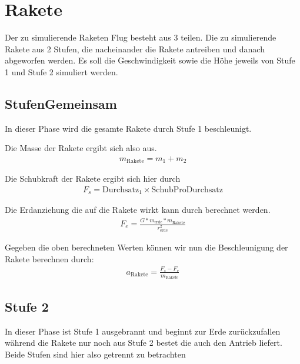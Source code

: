 \documentclass[10pt]{scrartcl}
\author{Oliver Steenbuck, Karolina Bernat}
\title{\titletext}
\date{12.12.2012}
\begin{document}
\maketitle
\setcounter{tocdepth}{3}
\tableofcontents
\listoffigures
\lstlistoflistings


\section{Rakete}
	Der zu simulierende Raketen Flug besteht aus 3 teilen. Die zu simulierende Rakete aus 2 Stufen, die nacheinander die Rakete antreiben und danach abgeworfen werden.
	Es soll die Geschwindigkeit sowie die Höhe jeweils von Stufe 1 und Stufe 2 simuliert werden.
	

	\subsection{StufenGemeinsam} \label{sec:stufenGemeinsam}
	In dieser Phase wird die gesamte Rakete durch Stufe 1 beschleunigt.
	
	Die Masse der Rakete ergibt sich also aus.
	\begin{align} 
	m_{\text{Rakete}} = m_1 + m_2
	\end{align}

	Die Schubkraft der Rakete ergibt sich hier durch
	\begin{align}
	F_s = \text{Durchsatz}_1 \times \text{SchubProDurchsatz}
	\end{align}

	Die Erdanziehung die auf die Rakete wirkt kann durch berechnet werden.
	\begin{align}
	F_e = \frac{G * m_{\text{erde}} * m_{\text{Rakete}}}{r_{\text{erde}}^2}
	\end{align}
	
	Gegeben die oben berechneten Werten können wir nun die Beschleunigung der Rakete berechnen durch:
	\begin{align}
	a_{\text{Rakete}} = \frac{F_s - F_e}{m_{\text{Rakete}}}
	\end{align}
	
	\subsection{Stufe 2}
	In dieser Phase ist Stufe 1 ausgebrannt und beginnt zur Erde zurückzufallen während die Rakete nur noch aus Stufe 2 bestet die auch den Antrieb liefert. Beide Stufen sind hier also getrennt zu betrachten	
	
\end{document}
